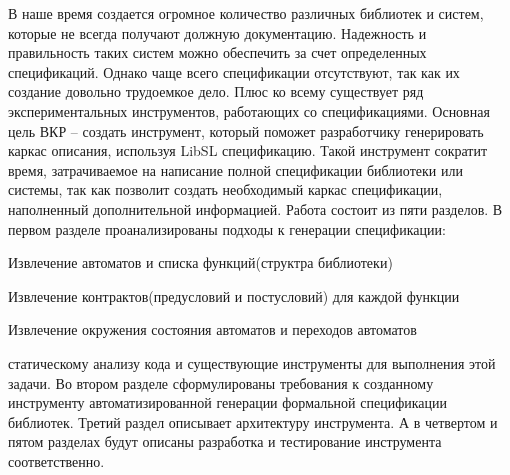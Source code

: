 \intro

В наше время создается огромное количество различных библиотек и систем, которые не всегда получают должную документацию. Надежность и правильность таких систем можно обеспечить за счет определенных спецификаций.
Однако чаще всего спецификации отсутствуют, так как их создание довольно трудоемкое дело. Плюс ко всему существует ряд экспериментальных инструментов, работающих со спецификациями.
Основная цель ВКР – создать инструмент, который поможет разработчику генерировать каркас описания, используя LibSL спецификацию. Такой инструмент сократит время, затрачиваемое на написание полной спецификации библиотеки или системы, так как позволит создать необходимый каркас спецификации, наполненный дополнительной информацией.
Работа состоит из пяти разделов. В первом разделе проанализированы подходы к генерации спецификации:
%
\begin{itemize*}
\item Извлечение автоматов и списка функций(структра библиотеки)
\item Извлечение контрактов(предусловий и постусловий) для каждой функции
\item Извлечение окружения состояния автоматов и переходов автоматов
\end{itemize*}
%

статическому анализу кода и существующие инструменты для выполнения этой задачи. Во втором разделе сформулированы требования к созданному инструменту автоматизированной генерации формальной спецификации библиотек. Третий раздел описывает архитектуру инструмента. А в четвертом и пятом разделах будут описаны разработка и тестирование инструмента соответственно.
